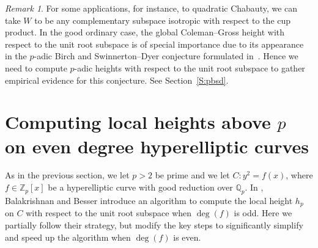 \documentclass[11pt, a4paper]{amsart}
\newcommand{\Q}{\mathbb{Q}}
\newcommand{\Z}{\mathbb{Z}}
\theoremstyle{remark}
\newtheorem{remark}[theorem]{Remark}
\numberwithin{equation}{section}
\newcommand{\sg}{{}}
\newcommand{\sm}{{}}
\begin{document}
\begin{remark}\label{unit-root}
For some applications, for instance, to quadratic Chabauty, we can take $W$ to be any
  complementary subspace isotropic with respect to the cup product.
 In the good ordinary case, the
  global Coleman--Gross height with respect to the unit root subspace is of
  special importance due to its appearance in the 
  $p$-adic Birch and Swinnerton--Dyer conjecture formulated in~\cite{BMS16}.
  Hence we need to
  compute $p$-adic heights with respect to the unit
  root subspace to gather empirical evidence for this conjecture. See
  Section~\ref{S:pbsd}.
\end{remark}
\section{Computing local heights above $p$ on even degree hyperelliptic curves}\label{sec:Algorithm-computations}

As in the previous section, we let 
$p>2$ be prime and we let $C\colon y^2=f(x)$\sg{, where $f\in\Z_p[x]$} be a hyperelliptic curve with good reduction over $\Q_p$. In \cite{BBHeights},  Balakrishnan and Besser
introduce an algorithm to compute the local height $h_p$ on $C$ with respect to
the unit root subspace when $\deg(f)$ is odd. Here we partially follow
their strategy, but modify the key steps to significantly simplify and
speed up the algorithm %
when $\deg(f)$ is even. 
\end{document}
